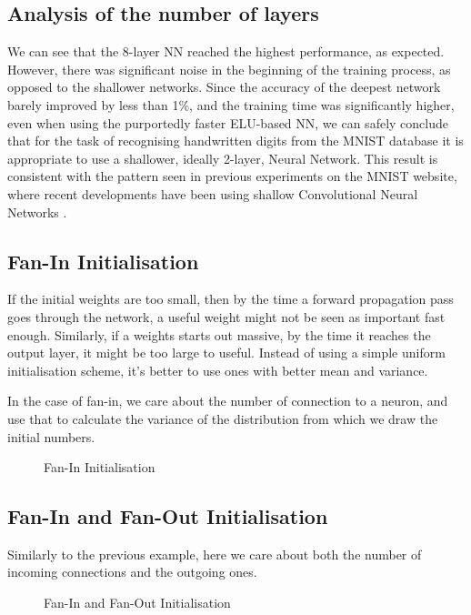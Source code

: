 \documentclass{article}
\begin{document}
\subsection{Analysis of the number of layers}
We can see that the 8-layer NN reached the highest performance, as expected. However, there was significant noise in the beginning of the training process, as opposed to the shallower networks. Since the accuracy of the deepest network barely improved by less than 1\%, and the training time was significantly higher, even when using the purportedly faster ELU-based NN, we can safely conclude that for the task of recognising handwritten digits from the MNIST database it is appropriate to use a shallower, ideally 2-layer, Neural Network. This result is consistent with the pattern seen in previous experiments on the MNIST website, where recent developments have been using shallow Convolutional Neural Networks \citep{lecun_1998}.

\newpage

\subsection{Fan-In Initialisation}
If the initial weights are too small, then by the time a forward propagation pass goes through the network, a useful weight might not be seen as important fast enough. Similarly, if a weights starts out massive, by the time it reaches the output layer, it might be too large to useful. Instead of using a simple uniform initialisation scheme, it's better to use ones with better mean and variance. \citep{andyljones_2015}

In the case of fan-in, we care about the number of connection to a neuron, and use that to calculate the variance of the distribution from which we draw the initial numbers.\citep{andyljones_2015}
\begin{figure}[H]
    \centering
    \begin{subfigure}{}
      
    \end{subfigure}
    \begin{subfigure}{}
      
    \end{subfigure}
    \caption{Fan-In Initialisation}
\end{figure}

\subsection{Fan-In and Fan-Out Initialisation}
Similarly to the previous example, here we care about both the number of incoming connections and the outgoing ones.
\begin{figure}[H]
    \centering
    \begin{subfigure}{}
      
    \end{subfigure}
    \begin{subfigure}{}
      
    \end{subfigure}
    \caption{Fan-In and Fan-Out Initialisation}
\end{figure}
\end{document}
